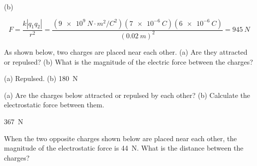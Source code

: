 \documentclass[]{exam}
\begin{document}
\begin{questions}
\begin{solution}
(b)

\begin{equation*}
    F = \frac{k \left|q_1 q_2\right|}{r^2} = \frac{\left(\SI{9e9}{N\cdot m^2/C^2}\right)(\SI{7e-6}{C})(\SI{6e-6}{C})}{\left(\SI{0.02}{m}\right)^2} = \boxed{\SI{945}{N}}
\end{equation*}
\end{solution}


\question \label{mJu5SD}
As shown below, two charges are placed near each other. (a) Are they attracted or repulsed? (b) What is the magnitude of the electric force between the charges?

\begin{center}
\end{center}


\begin{solution}
(a) Repulsed. (b) \SI{180}{N}
\end{solution}


\question \label{NqU30G}
(a) Are the charges below attracted or repulsed by each other? (b) Calculate the electrostatic force between them.

\begin{center}
\end{center}


\begin{solution}
\SI{367}{N}
\end{solution}


\question \label{S2QW5m}
When the two opposite charges shown below are placed near each other, the magnitude of the electrostatic force is \SI{44}{N}. What is the distance between the charges?

\begin{center}
\end{center}




\end{questions}
\end{document}
